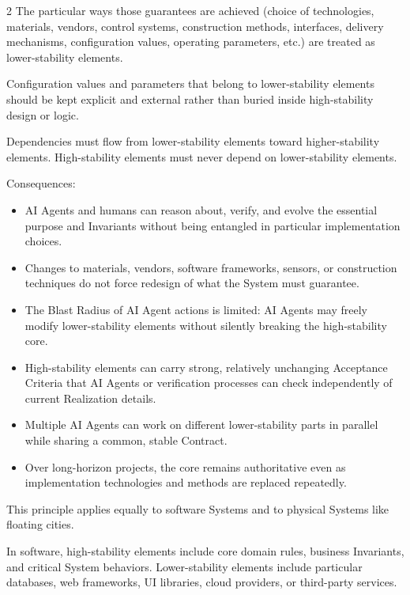 \begin{multicols}{2}
The particular ways those guarantees are achieved (choice of technologies, materials, vendors, control systems, construction methods, interfaces, delivery mechanisms, configuration values, operating parameters, etc.) are treated as lower-stability elements.

Configuration values and parameters that belong to lower-stability elements should be kept explicit and external rather than buried inside high-stability design or logic.

Dependencies must flow from lower-stability elements toward higher-stability elements. High-stability elements must never depend on lower-stability elements.

Consequences:

\begin{itemize}\setlength{\itemsep}{0pt}\setlength{\parskip}{0pt}

\item AI Agents and humans can reason about, verify, and evolve the essential purpose and Invariants without being entangled in particular implementation choices.

\item Changes to materials, vendors, software frameworks, sensors, or construction techniques do not force redesign of what the System must guarantee.

\item The Blast Radius of AI Agent actions is limited: AI Agents may freely modify lower-stability elements without silently breaking the high-stability core.

\item High-stability elements can carry strong, relatively unchanging Acceptance Criteria that AI Agents or verification processes can check independently of current Realization details.

\item Multiple AI Agents can work on different lower-stability parts in parallel while sharing a common, stable Contract.

\item Over long-horizon projects, the core remains authoritative even as implementation technologies and methods are replaced repeatedly.

\end{itemize}

This principle applies equally to software Systems and to physical Systems like floating cities.

In software, high-stability elements include core domain rules, business Invariants, and critical System behaviors. Lower-stability elements include particular databases, web frameworks, UI libraries, cloud providers, or third-party services.


\end{multicols}

